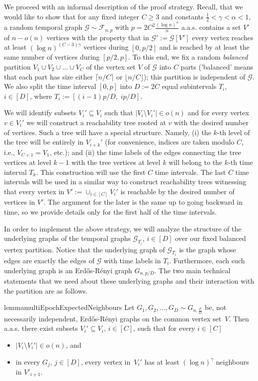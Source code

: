 \documentclass[a4paper,11pt]{article}
\makeatletter
\theoremstyle{definition}
\theoremstyle{plain}
\newcommand{\G}{\mathcal G}
\newcommand{\F}{\mathcal F}
\newcommand{\aas}{a.a.s.\@\xspace}
\newcommand{\Erdos}{Erd\H{o}s}
\newcommand{\Renyi}{R\'enyi}
\newcommand{\ER}{\Erdos-\Renyi}
\makeatother
\begin{document}
We proceed with an informal description of the proof strategy.
%
Recall, that we would like to show that for any fixed integer $C \geq 3$ and constants $\frac{1}{2}<\gamma<\alpha<1$, a random temporal graph
$\G \sim \F_{n,p}$ with $p = 2C^2 \frac{(\log n)^\alpha}{n}$
\aas contains a set $V'$ of $n-o(n)$ vertices with the property that
in $\G' := \G[V']$ every vertex
reaches at least $(\log n)^{(C-3)\gamma}$ vertices during $[0,p/2]$ and
is reached by at least the same number of vertices during $[p/2,p]$.
To this end, we fix a random \emph{balanced} partition $V_1 \cup V_2 \cup \ldots \cup V_C$
of the vertex set $V$ of $\G$ into $C$ parts ('balanced' means that each part has size either $\lceil n/C \rceil$ or $\lfloor n / C \rfloor$); this partition is independent of $\G$. 
We also split the time interval $[0,p]$ into $D := 2C$ 
equal subintervals $T_i$, $i \in [D]$, where $T_i := [(i-1)p/D,\; ip/D]$. 

We will identify subsets $V_i' \subseteq V_i$ such that $|V_i \setminus V_i'| \in o(n)$ 
and for every vertex $v \in V_i'$ we will construct a reachability
tree rooted at $v$ with the desired number of vertices.
Such a tree will have a special structure. Namely,
(i) the $k$-th level of the tree will be entirely in $V_{i+k}'$ 
(for convenience, indices are taken modulo $C$, i.e., $V_{C+1} = V_1$, etc.); and (ii) the time labels of the edges connecting the tree vertices at level $k-1$ with the tree vertices at level $k$ will belong to the $k$-th time interval $T_k$. 
This construction will use the first $C$ time intervals. The last $C$ time intervals will be used in a similar way
to construct reachability trees witnessing that every vertex in $V' := \cup_{i \in [C]} V_i'$ is reachable by the desired number of vertices in $V'$. The argument for the later is the same up to going backward in time, so we provide details only for the first half of the time intervals.

In order to implement the above strategy, we will analyze the structure of the underlying graphs 
of the temporal graphs $\G_{T_i}$, $i \in [D]$ over our fixed balanced vertex partition. Notice that the underlying graph of $\G_{T_i}$ is the graph whose edges are exactly the edges of $\G$ with time labels in $T_i$. Furthermore, each such underlying graph is an \ER{} graph $G_{n,p/D}$. 
The two main technical statements that we need about these underlying graphs and their interaction
with the partition are as follows.

\begin{restatable}{lemma}{multiEpochExpectedNeighbours}
	\label{lm:multi-epoch-expected-neighbours}
	Let $G_1, G_2, \ldots, G_D \sim G_{n, \frac{p}{D}}$ be, not necessarily independent, \ER{}
	graphs on the common vertex set~$V$. Then \aas there exist subsets $V_i' \subseteq V_i$, $i \in [C]$, such that for every $i \in [C]$
	\begin{itemize}
		\item $|V_i\setminus V_i'|\in o(n)$, and
		\item in every $G_j$, $j \in [D]$, every vertex in~$V_i'$ has at least $(\log n)^\gamma$ neighbours in $V'_{i+1}$.
	\end{itemize}
\end{restatable}
\end{document}
